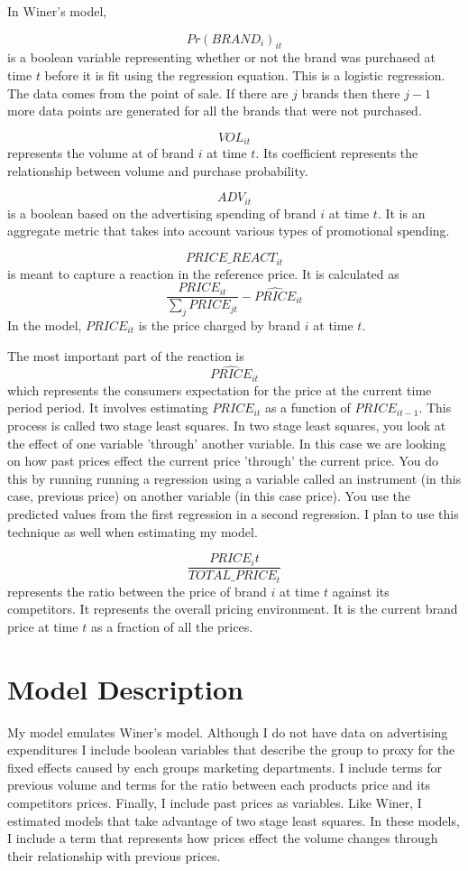 \documentclass{article}
\begin{document}
In Winer's model,

$${Pr(BRAND_i)}_{it} $$ is a boolean variable representing whether or not the brand was purchased at time $t$ before it is fit using the regression equation. This is a logistic regression. The data comes from the point of sale. If there are $j$ brands then there $j-1$ more data points are generated for all the brands that were not purchased.

$$VOL_{it}$$ represents the volume at of brand $i$ at time $t$. Its coefficient represents the relationship between volume and purchase probability.

$$ADV_{it}$$ is a boolean based on the advertising spending of brand $i$ at time $t$. It is an aggregate metric that takes into account various types of promotional spending.

$$PRICE\_REACT_{it}$$ is meant to capture a reaction in the reference price. It is calculated as $$\dfrac{PRICE_{it}} {\sum_j PRICE_{jt}} - \widehat{PRICE}_{it}$$ In the model, ${PRICE}_{it}$ is the price charged by brand $i$ at time $t$. 

The most important part of the reaction is $$\hat{PRICE}_{it}$$ which represents the consumers expectation for the price at the current time period period. It involves estimating ${PRICE}_{it}$ as a function of ${PRICE}_{it-1}$. This process is called two stage least squares. In two stage least squares, you look at the effect of one variable 'through' another variable.  In this case we are looking on how past prices effect the current price 'through' the current price. You do this by running running a regression using a variable called an instrument (in this case, previous price) on another variable (in this case price). You use the predicted values from the first regression in a second regression.  I plan to use this technique as well when estimating my model.

$$ \dfrac{PRICE_it}{TOTAL\_PRICE_{t}}$$ represents the ratio between the price of brand $i$ at time $t$ against its competitors. It represents the overall pricing environment. It is the current brand price at time $t$ as a fraction of all the prices.

\section{Model Description}

My model emulates Winer's model. Although I do not have data on advertising expenditures I include boolean variables that describe the group to proxy for the fixed effects caused by each groups marketing departments. I include terms for previous volume and terms for the ratio between each products price and its competitors prices. Finally, I include past prices as variables. Like Winer, I estimated models that take advantage of two stage least squares. In these models, I include a term that represents how prices effect the volume changes through their relationship with previous prices. 
\end{document}

